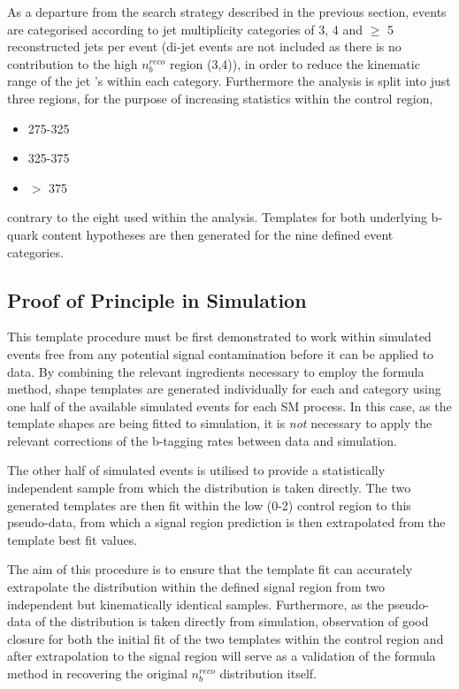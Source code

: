 As a departure from the \alphat search strategy described in the previous section, events are categorised according to jet multiplicity categories of 3, 4 and $\geq$ 5 reconstructed jets per event (di-jet events are not included as there is no contribution to the high $n_{b}^{reco}$ region (3,4)), in order to reduce the kinematic range of the jet \pt's within each category. Furthermore the analysis is split into just three \theht regions, for the purpose of increasing statistics within the control region, 

\begin{itemize}
\item 275-325 \GeV
\item 325-375 \GeV
\item $>$ 375 \GeV
\end{itemize}

contrary to the eight used within the \alphat analysis. Templates for both underlying b-quark content hypotheses are then generated for the nine defined event categories.

\subsection{Proof of Principle in Simulation}
\label{subsec:templateclosuretest}

This template procedure must be first demonstrated to work within simulated events free from any potential signal contamination before it can be applied to data. By combining the relevant ingredients necessary to employ the formula method, \nbreco shape templates are generated individually for each \njet and \theht category using one half of the available simulated events for each \ac{SM} process. In this case, as the template shapes are being fitted to simulation, it is \emph{not} necessary to apply the relevant corrections of the b-tagging rates between data and simulation. 

The other half of simulated events is utilised to provide a statistically independent sample from which the \nbreco distribution is taken directly. The two generated templates are then fit within the low \nbreco (0-2) control region to this pseudo-data, from which a signal region prediction is then extrapolated from the template best fit values. 

The aim of this procedure is to ensure that the template fit can accurately extrapolate the \nbreco distribution within the defined signal region from two independent but kinematically identical samples. Furthermore, as the pseudo-data of the \nbreco distribution is taken directly from simulation, observation of good closure for both the initial fit of the two templates within the control region and after extrapolation to the signal region will serve as a validation of the formula method in recovering the original $n_{b}^{reco}$ distribution itself. 

